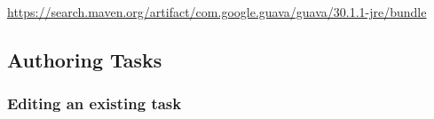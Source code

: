 \documentclass[presentation]{beamer}\mode<presentation>{\usetheme{AMSBolognaFC}}
\begin{document}
\begin{frame}[allowframebreaks]
\begin{center}
        {\scriptsize\url{https://search.maven.org/artifact/com.google.guava/guava/30.1.1-jre/bundle}}
    \end{center}

\end{frame}

\subsection{Authoring Tasks}

\begin{frame}[allowframebreaks]
\frametitle{Editing an existing task}
    

    

    \framebreak

    

    

\end{frame}
\end{document}
